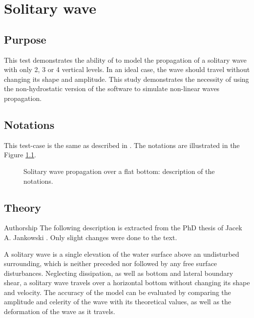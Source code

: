 \chapter{Solitary wave}
%
%

\section{Purpose}
%
This test demonstrates the ability of  to model the
propagation of a solitary wave with only 2, 3 or 4 vertical levels.
In an ideal case, the wave should travel without changing its shape and amplitude.
This study demonstrates the necessity of using the non-hydrostatic
version of the software to simulate non-linear waves propagation.
%
\section{Notations}

This test-case is the same as described in \cite{Jankowski1999}. The notations
are illustrated in the Figure \ref{fig:solit_notations}.

\begin{figure}[H]
\begin{center}
\end{center}
\caption{Solitary wave propagation over a flat bottom: description of the notations.}
\label{fig:solit_notations}
\end{figure}


\section{Theory}

\begin{WarningBlock}{Authorship}
The following description is extracted from the PhD thesis of Jacek A. Jankowski \cite{Jankowski1999}.
Only slight changes were done to the text.
\end{WarningBlock}

A solitary wave is a single elevation of the water surface above an undisturbed surrounding,
which is neither preceded nor followed by any free surface disturbances. Neglecting
dissipation, as well as bottom and lateral boundary shear, a solitary wave travels over a
horizontal bottom without changing its shape and velocity.
The accuracy of the model can be evaluated by comparing the
amplitude and celerity of the wave with its theoretical values, as well as the deformation
of the wave as it travels.\\

